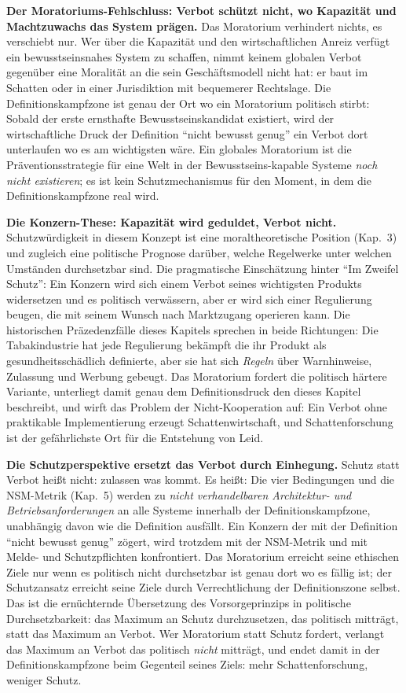 \documentclass[acmlarge, noacm]{acmart}
\begin{document}
\textbf{Der Moratoriums-Fehlschluss: Verbot schützt nicht, wo Kapazität und Machtzuwachs das System prägen.} Das Moratorium verhindert nichts, es verschiebt nur. Wer über die Kapazität und den wirtschaftlichen Anreiz verfügt ein bewusstseinsnahes System zu schaffen, nimmt keinem globalen Verbot gegenüber eine Moralität an die sein Geschäftsmodell nicht hat: er baut im Schatten oder in einer Jurisdiktion mit bequemerer Rechtslage. Die Definitionskampfzone ist genau der Ort wo ein Moratorium politisch stirbt: Sobald der erste ernsthafte Bewusstseinskandidat existiert, wird der wirtschaftliche Druck der Definition ``nicht bewusst genug'' ein Verbot dort unterlaufen wo es am wichtigsten wäre. Ein globales Moratorium ist die Präventionsstrategie für eine Welt in der Bewusstseins-kapable Systeme \textit{noch nicht existieren}; es ist kein Schutzmechanismus für den Moment, in dem die Definitionskampfzone real wird.

\textbf{Die Konzern-These: Kapazität wird geduldet, Verbot nicht.} Schutzwürdigkeit in diesem Konzept ist eine moraltheoretische Position (Kap.~3) und zugleich eine politische Prognose darüber, welche Regelwerke unter welchen Umständen durchsetzbar sind. Die pragmatische Einschätzung hinter ``Im Zweifel Schutz'': Ein Konzern wird sich einem Verbot seines wichtigsten Produkts widersetzen und es politisch verwässern, aber er wird sich einer Regulierung beugen, die mit seinem Wunsch nach Marktzugang operieren kann. Die historischen Präzedenzfälle dieses Kapitels sprechen in beide Richtungen: Die Tabakindustrie hat jede Regulierung bekämpft die ihr Produkt als gesundheitsschädlich definierte, aber sie hat sich \textit{Regeln} über Warnhinweise, Zulassung und Werbung gebeugt. Das Moratorium fordert die politisch härtere Variante, unterliegt damit genau dem Definitionsdruck den dieses Kapitel beschreibt, und wirft das Problem der Nicht-Kooperation auf: Ein Verbot ohne praktikable Implementierung erzeugt Schattenwirtschaft, und Schattenforschung ist der gefährlichste Ort für die Entstehung von Leid.

\textbf{Die Schutzperspektive ersetzt das Verbot durch Einhegung.} Schutz statt Verbot heißt nicht: zulassen was kommt. Es heißt: Die vier Bedingungen und die NSM-Metrik (Kap.~5) werden zu \textit{nicht verhandelbaren Architektur- und Betriebsanforderungen} an alle Systeme innerhalb der Definitionskampfzone, unabhängig davon wie die Definition ausfällt. Ein Konzern der mit der Definition ``nicht bewusst genug'' zögert, wird trotzdem mit der NSM-Metrik und mit Melde- und Schutzpflichten konfrontiert. Das Moratorium erreicht seine ethischen Ziele nur wenn es politisch nicht durchsetzbar ist genau dort wo es fällig ist; der Schutzansatz erreicht seine Ziele durch Verrechtlichung der Definitionszone selbst. Das ist die ernüchternde Übersetzung des Vorsorgeprinzips in politische Durchsetzbarkeit: das Maximum an Schutz durchzusetzen, das politisch mitträgt, statt das Maximum an Verbot. Wer Moratorium statt Schutz fordert, verlangt das Maximum an Verbot das politisch \textit{nicht} mitträgt, und endet damit in der Definitionskampfzone beim Gegenteil seines Ziels: mehr Schattenforschung, weniger Schutz.
\end{document}
